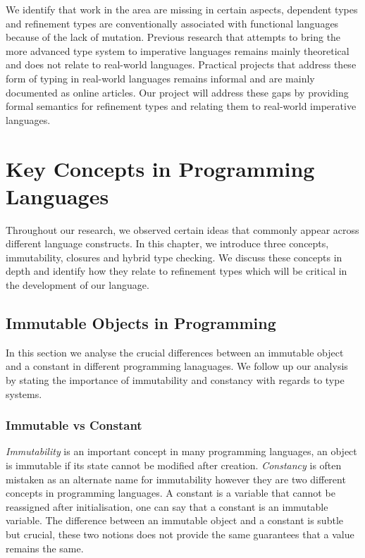 \documentclass[a4paper,12pt]{report}
\begin{document}
\par
We identify that work in the area are missing in certain aspects, dependent types 
and refinement types are conventionally associated with functional languages 
because of the lack of mutation. Previous research that attempts to bring the more 
advanced type system to imperative languages remains mainly theoretical and 
does not relate to real-world languages. Practical projects that address 
these form of typing in real-world languages remains informal and are 
mainly documented as online articles. Our project will address these gaps by 
providing formal semantics for refinement types and relating them to 
real-world imperative languages. 

\chapter{Key Concepts in Programming Languages} \label{chapter:key_concepts}
Throughout our research, we observed certain ideas that commonly appear across 
different language constructs. In this chapter, we introduce three concepts, 
immutability, closures and hybrid type checking. We discuss these concepts 
in depth and identify how they relate to refinement types which will 
be critical in the development of our language.

\section{Immutable Objects in Programming}
In this section we analyse the crucial differences between an immutable object   
and a constant in different programming lanaguages. We follow up our analysis by 
stating the importance of immutability and constancy with regards to type 
systems.

\subsection{Immutable vs Constant} \label{section:const_immutable}
\emph{Immutability} is an important concept in many programming languages, an 
object is immutable if its state cannot be modified after creation. 
\emph{Constancy} is often mistaken as an alternate name for 
immutability however they are two different concepts in programming languages. 
A constant is a variable that cannot be reassigned after initialisation, one can say 
that a constant is an immutable variable. 
The difference between an immutable object and a constant is subtle but crucial, 
these two notions does not provide the same guarantees that a value remains the 
same.
 
\end{document}
